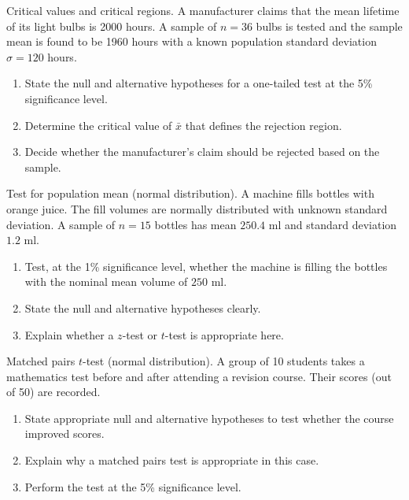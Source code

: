 \documentclass[11pt]{article}
\def\textbf#1{#1}%
\newcounter{question}
\begin{document}
 \newpage

\begin{question}
\textbf{Critical values and critical regions.}
A manufacturer claims that the mean lifetime of its light bulbs is 2000 hours. A sample of $n=36$ bulbs is tested and the sample mean is found to be 1960 hours with a known population standard deviation $\sigma=120$ hours.
\begin{enumerate}
    \item State the null and alternative hypotheses for a one-tailed test at the 5\% significance level.
    \item Determine the critical value of $\bar{x}$ that defines the rejection region.
    \item Decide whether the manufacturer's claim should be rejected based on the sample.
\end{enumerate}
\end{question}

\begin{question}
\textbf{Test for population mean (normal distribution).}
A machine fills bottles with orange juice. The fill volumes are normally distributed with unknown standard deviation. A sample of $n=15$ bottles has mean $250.4$ ml and standard deviation $1.2$ ml.
\begin{enumerate}
    \item Test, at the 1\% significance level, whether the machine is filling the bottles with the nominal mean volume of $250$ ml.
    \item State the null and alternative hypotheses clearly.
    \item Explain whether a $z$-test or $t$-test is appropriate here.
\end{enumerate}
\end{question}

\begin{question}
\textbf{Matched pairs $t$-test (normal distribution).}
A group of 10 students takes a mathematics test before and after attending a revision course. Their scores (out of 50) are recorded. 
\begin{enumerate}
    \item State appropriate null and alternative hypotheses to test whether the course improved scores.
    \item Explain why a matched pairs test is appropriate in this case.
    \item Perform the test at the 5\% significance level.
\end{enumerate}
\end{question}
\end{document}
